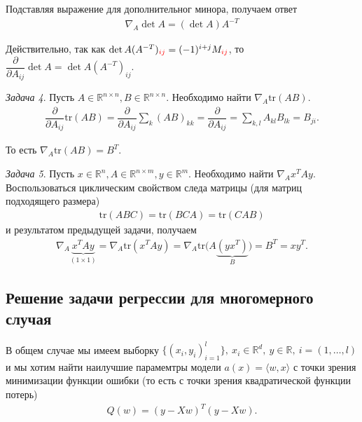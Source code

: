 \documentclass[%
	11pt,
	a4paper,
	utf8,
		]{article}
\begin{document}
Подставляя выражение для дополнительног минора, получаем ответ
\begin{align*}
	\boxed{\nabla_A \det A = (\det A) A^{-T}}
\end{align*}

Действительно, так как $ \det A (A^{-T})_{\color{red}ij}  = (-1)^{i + j} M_{\color{red}ij} $, то $ \dfrac{ \partial }{ \partial A_{ij} } \det A = \det A (A^{-T})_{ij} $.

\vspace*{3mm}\emph{Задача 4}. Пусть $ A \in \mathbb{R}^{n \times n}, B \in \mathbb{R}^{n \times n} $. Необходимо найти $ \nabla_A \text{tr} (AB) $.
\begin{align*}
	\dfrac{ \partial }{ \partial A_{ij} } \text{tr} (AB)  = \dfrac{ \partial }{ \partial A_{ij} } \sum_k (AB)_{kk} = \dfrac{ \partial }{ \partial A_{ij} } = \sum_{k,l} A_{kl}B_{lk} = B_{ji}.
\end{align*}

То есть $ \boxed{\nabla_A \text{tr} (AB) = B^T} $.

\vspace*{3mm}\emph{Задача 5}. Пусть $ x \in \mathbb{R}^n, A \in \mathbb{R}^{n \times m}, y \in \mathbb{R}^m $. Необходимо найти $ \nabla_A x^T A y $. Воспользоваться циклическим свойством следа матрицы (для матриц подходящего размера)
\begin{align*}
	\text{tr} (ABC) = \text{tr} (BCA) = \text{tr} (CAB)
\end{align*}
и результатом предыдущей задачи, получаем
\begin{align*}
	\nabla_A \underbrace{x^T A y}_{(1 \times 1)} = \nabla_A \text{tr} (x^T A y) = \nabla_A \text{tr} \big(  A \underbrace{(y x^T)}_B \big) = B^T = xy^T.
\end{align*}

\subsection{Решение задачи регрессии для многомерного случая}

В общем случае мы имеем выборку $ \{ (x_i, y_i)_{i=1}^l \},\ x_i \in \mathbb{R}^d, \ y \in \mathbb{R}, \ i = (1, \ldots, l) $ и мы хотим найти наилучшие парамемтры модели $ a(x) =  \langle w, x \rangle $ с точки зрения минимизации функции ошибки (то есть с точки зрения квадратической функции потерь)
\begin{align*}
	Q(w) = (y - X w)^T (y - X w).
\end{align*}
\end{document}
